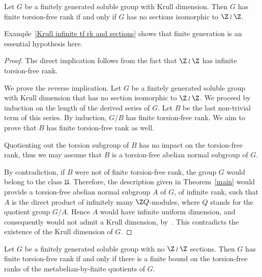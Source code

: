 \begin{corob}\label{corob1}
Let $G$ be a finitely generated soluble group with Krull dimension. Then $G$ has finite torsion-free rank if and only if $G$ has no sections isomorphic to $\Z\wr\Z$.
\end{corob}
Example~\ref{Krull infinite tf rk and sections} shows that finite generation is an essential hypothesis here.
\begin{proof}
The direct implication follows from the fact that $\Z \wr \Z$ has infinite torsion-free rank.

We prove the reverse implication. Let $G$ be a finitely generated soluble group with Krull dimension that has no section isomorphic to $\Z \wr \Z$. We proceed by induction on the length of the derived series of $G$. Let $B$ be the last non-trivial term of this series. By induction, $G/B$ has finite torsion-free rank. We aim to prove that $B$ has finite torsion-free rank as well.

Quotienting out the torsion subgroup of $B$ has no impact on the torsion-free rank, thus we may assume that $B$ is a torsion-free abelian normal subgroup of $G$.

By contradiction, if $B$ were not of finite torsion-free rank, the group $G$ would belong to the class $\mathfrak{U}$. Therefore, the description given in Theorem~\ref{main} would provide a torsion-free abelian normal subgroup $A$ of $G$, of infinite rank, such that $A$ is the direct product of infinitely many $\Z Q$-modules, where $Q$ stands for the quotient group $G/A$. Hence $A$ would have infinite uniform dimension, and consequently would not admit a Krull dimension, by~\cite[6.2.6]{MR}. This contradicts the existence of the Krull dimension of $G$.
\end{proof}

\begin{corob}\label{corob2}
Let $G$ be a finitely generated soluble group with no $\Z\wr\Z$ sections. Then $G$ has finite torsion-free rank if and only if there is a finite bound on the torsion-free ranks of the metabelian-by-finite quotients of $G$.
\end{corob}

